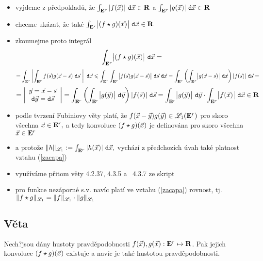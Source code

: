 \begin{itemize}
\item vyjdeme z p\v redpoklad\r u, \v ze $\int_{{{\mathbf E}^r}} |f({\vec{x}})|~\mathtt{d}{\vec{x}} \in{\mathbf R}$ a $\int_{{{\mathbf E}^r}} |g({\vec{x}})|~\mathtt{d}{\vec{x}} \in{\mathbf R}$

\item chceme uk\'azat, \v ze tak\'e $\int_{{{\mathbf E}^r}} \bigl|(f\star g)({\vec{x}})\bigr|~\mathtt{d}{\vec{x}} \in{\mathbf R}$

\item zkoumejme proto integr\'al $$\int_{{{\mathbf E}^r}} \bigl|(f\star g)({\vec{x}})\bigr|~\mathtt{d}{\vec{x}}=$$ $$=\int_{{{\mathbf E}^r}} \left|\int_{{{\mathbf E}^r}}f({\vec{s}})g({\vec{x}}-{\vec{s}})~\mathtt{d}{\vec{s}} ~\right|~\mathtt{d}{\vec{x}} \leqslant \int_{{{\mathbf E}^r}} \int_{{{\mathbf E}^r}} \bigl|f({\vec{s}})g({\vec{x}}-{\vec{s}})\bigr|~\mathtt{d}{\vec{s}}~\mathtt{d}{\vec{x}} =\int_{{{\mathbf E}^r}} \left(\int_{{{\mathbf E}^r}} \bigl|g({\vec{x}}-{\vec{s}})\bigr|~\mathtt{d}{\vec{x}}\right) |f({\vec{s}})|~\mathtt{d}{\vec{s}} =$$
%
$$=  \left|\begin{array}{c} {\vec{y}} = {\vec{x}} -{\vec{s}}\\ \mathtt{d}{\vec{y}}=\mathtt{d}{\vec{s}} \end{array}\right|= \int_{{{\mathbf E}^r}} \left(\int_{{{\mathbf E}^r}} \bigl|g({\vec{y}})\bigr|~\mathtt{d}{\vec{y}}\right) |f({\vec{s}})|~\mathtt{d}{\vec{s}}= \int_{{{\mathbf E}^r}} \bigl|g({\vec{y}})\bigr|~\mathtt{d}{\vec{y}} \cdot  \int_{{{\mathbf E}^r}} \bigl|f({\vec{x}})\bigr|~\mathtt{d}{\vec{x}} \in {\mathbf R}$$

\item podle tvrzen\' i Fubiniovy v\v ety plat\'i, \v ze $f({\vec{x}}-{\vec{y}})g({\vec{y}})\in{\mathscr L}_1({{\mathbf E}^r})$ pro skoro v\v sechna ${\vec{x}}\in{{\mathbf E}^r},$ a tedy konvoluce $(f\star g)({\vec{x}})$ je definov\'ana pro skoro v\v sechna ${\vec{x}}\in{{\mathbf E}^r}$
    
\item a proto\v ze $\|h\|_{{\mathscr L}_1}:= \int_{{{\mathbf E}^r}} |h({\vec{x}})|~\mathtt{d}{\vec{x}},$ vych\'az\' i z p\v redchoz\' ich \' uvah tak\'e platnost vztahu (\ref{zacapa})

\item vyu\v z\'iv\'ame p\v ritom v\v ety 4.2.37, 4.3.5 a \ 4.3.7 ze skript \cite{Krbalek_MAB4}

\item pro  funkce nez\'aporn\'e s.v. nav\' ic plat\' i ve vztahu  (\ref{zacapa}) rovnost, tj. $\|f\star g\|_{{\mathscr L}_1} = \|f\|_{{\mathscr L}_1} \cdot  \|g\|_{{\mathscr L}_1}$

\end{itemize}


\subsection{Věta}

Nech?jsou dány hustoty pravděpodobnosti $f({\vec{x}}),g({\vec{x}}):{{\mathbf E}^r}\mapsto{\mathbf R}$. Pak jejich konvoluce $(f\star g)({\vec{x}})$ existuje a nav\' ic je také hustotou pravděpodobnosti. 

\Proof

